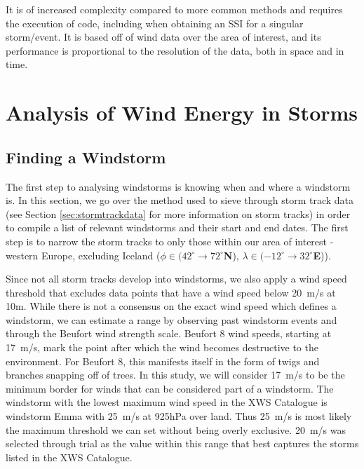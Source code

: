         It is of increased complexity compared to more common methods and requires the execution of code, including when obtaining an SSI for a singular storm/event. It is based off of wind data over the area of interest, and its performance is proportional to the resolution of the data, both in space and in time. 
        
\section{Analysis of Wind Energy in Storms}
    \subsection{Finding a Windstorm}

        The first step to analysing windstorms is knowing when and where a windstorm is. In this section, we go over the method used to sieve through storm track data (see Section \ref{sec:stormtrackdata} for more information on storm tracks) in order to compile a list of relevant windstorms and their start and end dates. The first step is to narrow the storm tracks to only those within our area of interest - western Europe, excluding Iceland ($\phi \in (42^\circ \rightarrow 72^\circ$\textbf{N}), $\lambda \in (-12^\circ \rightarrow 32^\circ$\textbf{E})).

        Since not all storm tracks develop into windstorms, we also apply a wind speed threshold that excludes data points that have a wind speed below 20~m/s at 10m. While there is not a consensus on the exact wind speed which defines a windstorm, we can estimate a range by observing past windstorm events and through the Beufort wind strength scale. Beufort 8 wind speeds, starting at 17~m/s, mark the point after which the wind becomes destructive to the environment. For Beufort 8, this manifests itself in the form of twigs and branches snapping off of trees. In this study, we will consider 17~m/s to be the minimum border for winds that can be considered part of a windstorm. The windstorm with the lowest maximum wind speed in the XWS Catalogue is windstorm Emma with 25~m/s at 925hPa over land. Thus 25~m/s is most likely the maximum threshold we can set without being overly exclusive. 20~m/s was selected through trial as the value within this range that best captures the storms listed in the XWS Catalogue.
        
